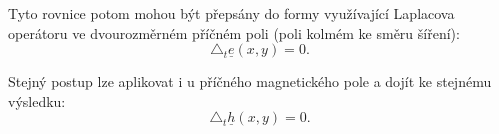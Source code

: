 \documentclass[12pt,a4paper,oneside]{article}
\numberwithin{equation}{section} %
\numberwithin{figure}{section} %
\numberwithin{table}{section} %
\newcommand{\faz}[1]{{\underline{#1}}} %
\begin{document}
Tyto rovnice potom mohou být přepsány do formy využívající Laplacova operátoru ve dvourozměrném příčném poli (poli kolmém ke směru šíření):
\begin{equation}
\triangle _t \faz{e} (x, y) = 0 .
\end{equation}


Stejný postup lze aplikovat i u příčného magnetického pole a dojít ke stejnému výsledku:
\begin{equation}
\triangle _t \faz{h} (x, y) = 0 .
\end{equation}


%
%
\end{document}
